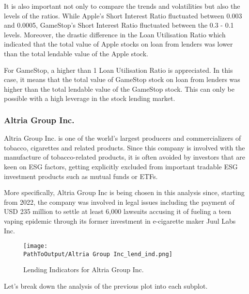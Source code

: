 It is also important not only to compare the trends and volatilities but also the levels of the ratios. While Apple's Short Interest Ratio fluctuated between 0.003 and 0.0005, GameStop's Short Interest Ratio fluctuated between the 0.3 - 0.1 levels. Moreover, the drastic difference in the Loan Utilisation Ratio which indicated that the total value of Apple stocks on loan from lenders was lower than the total lendable value of the Apple stock.

For GameStop, a higher than 1 Loan Utilisation Ratio is appreciated. In this case, it means that the total value of GameStop stock on loan from lenders was higher than the total lendable value of the GameStop stock. This can only be possible with a high leverage in the stock lending market.


\subsubsection{Altria Group Inc.}

Altria Group Inc. is one of the world's largest producers and commercializers of tobacco, cigarettes and related products. Since this company is involved with the manufacture of tobacco-related products, it is often avoided by investors that are keen on ESG factors, getting explicitly excluded from important tradable ESG investment products such as mutual funds or ETFs.

More specifically, Altria Group Inc is being chosen in this analysis since, starting from 2022, the company was involved in legal issues including the payment of USD 235 million to settle at least 6,000 lawsuits accusing it of fueling a teen vaping epidemic through its former investment in e-cigarette maker Juul Labs Inc.

\begin{figure}[H]
	\centering
	\caption{Lending Indicators for Altria Group Inc.}
	  \centering
	  \texttt{[image: \\PathToOutput/Altria Group Inc\_lend\_ind.png]}
	\label{fig:altria_lending_indicators}
\end{figure}

Let's break down the analysis of the previous plot into each subplot.


